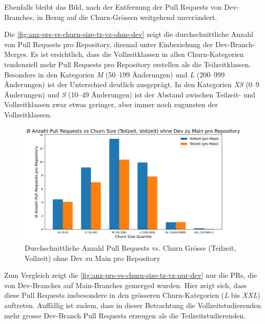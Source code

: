 Ebenfalls bleibt das Bild, nach der Entfernung der Pull Requests von Dev-Branches, in Bezug auf die Churn-Grössen weitgehend unverändert.

Die \autoref{fig:anz-prs-vs-churn-size-tz-vz-ohne-dev} zeigt die durchschnittliche Anzahl von Pull Requests pro Repository, diesmal unter Einbeziehung der Dev-Branch-Merges. Es ist ersichtlich, dass die Vollzeitklassen in allen Churn-Kategorien tendenziell mehr Pull Requests pro Repository erstellen als die Teilzeitklassen. Besonders in den Kategorien \textit{M} (50–199 Änderungen) und \textit{L} (200–999 Änderungen) ist der Unterschied deutlich ausgeprägt. In den Kategorien \textit{XS} (0–9 Änderungen) und \textit{S} (10–49 Änderungen) ist der Abstand zwischen Teilzeit- und Vollzeitklassen zwar etwas geringer, aber immer noch zugunsten der Vollzeitklassen.

\begin{figure}[htbp]
    \includegraphics[width=\textwidth]{Figures/avg-anz-prs-vs-churn-size-tz-vz-pro-repo-ohne-dev.png}
    \caption{Durchschnittliche Anzahl Pull Requests vs. Churn Grösse (Teilzeit, Vollzeit) ohne Dev zu Main pro Repository}
    \label{fig:anz-prs-vs-churn-size-tz-vz-ohne-dev}
\end{figure}

Zum Vergleich zeigt die \autoref{fig:anz-prs-vs-churn-size-tz-vz-nur-dev} nur die PRs, die von Dev-Branches auf Main-Branches gemerged wurden. Hier zeigt sich, dass diese Pull Requests insbesondere in den grösseren Churn-Kategorien (\textit{L} bis \textit{XXL}) auftreten. Auffällig ist zudem, dass in dieser Betrachtung die Vollzeitstudierenden mehr grosse Dev-Branch Pull Requests erzeugen als die Teilzeitstudierenden.

